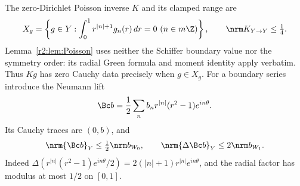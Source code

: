 The zero-Dirichlet Poisson inverse $K$ and its clamped range are
\begin{equation}\label{br:eq:clamped-space}
 X_g=\left\{g\in Y:\int_0^1r^{|n|+1}g_n(r)\,dr=0\ (n\in m\Z)\right\},
 \qquad \nrm K_{Y\to Y}\le\tfrac14.
\end{equation}
Lemma~\ref{r2:lem:Poisson} uses neither the Schiffer boundary value nor the
symmetry order: its radial Green formula and moment identity apply
verbatim. Thus $Kg$ has zero Cauchy data precisely when $g\in X_g$.
For a boundary series introduce the Neumann lift
\begin{equation}\label{br:eq:neumann-lift}
 \Bc b=\frac12\sum_n b_nr^{|n|}(r^2-1)e^{in\theta}.
\end{equation}
Its Cauchy traces are $(0,b)$, and
\begin{equation}\label{br:eq:neumann-lift-bounds}
 \nrm{\Bc b}_Y\le\tfrac12\nrm b_{W_0},\qquad
 \nrm{\Delta\Bc b}_Y\le2\nrm b_{W_1}.
\end{equation}
Indeed $\Delta(r^{|n|}(r^2-1)e^{in\theta}/2)
=2(|n|+1)r^{|n|}e^{in\theta}$, and the radial factor has modulus at most
$1/2$ on $[0,1]$.

